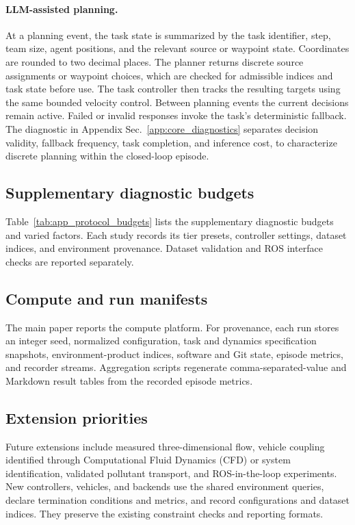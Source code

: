 \paragraph{LLM-assisted planning.}
At a planning event, the task state is summarized by the task identifier, step, team size, agent positions, and the relevant source or waypoint state. Coordinates are rounded to two decimal places. The planner returns discrete source assignments or waypoint choices, which are checked for admissible indices and task state before use. The task controller then tracks the resulting targets using the same bounded velocity control. Between planning events the current decisions remain active. Failed or invalid responses invoke the task's deterministic fallback. The diagnostic in Appendix Sec.~\ref{app:core_diagnostics} separates decision validity, fallback frequency, task completion, and inference cost, to characterize discrete planning within the closed-loop episode.

\subsection{Supplementary diagnostic budgets}



Table~\ref{tab:app_protocol_budgets} lists the supplementary diagnostic budgets and varied factors. Each study records its tier presets, controller settings, dataset indices, and environment provenance. Dataset validation and ROS interface checks are reported separately.

\subsection{Compute and run manifests}

The main paper reports the compute platform. For provenance, each run stores an integer seed, normalized configuration, task and dynamics specification snapshots, environment-product indices, software and Git state, episode metrics, and recorder streams. Aggregation scripts regenerate comma-separated-value and Markdown result tables from the recorded episode metrics.


\subsection{Extension priorities}
\label{app:limitations}

Future extensions include measured three-dimensional flow, vehicle coupling identified through Computational Fluid Dynamics (CFD) or system identification, validated pollutant transport, and ROS-in-the-loop experiments. New controllers, vehicles, and backends use the shared environment queries, declare termination conditions and metrics, and record configurations and dataset indices. They preserve the existing constraint checks and reporting formats.
